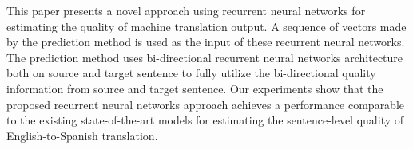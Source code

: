 This paper presents a novel approach using recurrent neural networks for estimating the quality of machine translation output. A sequence of vectors made by the prediction method is used as the input of these recurrent neural networks. The prediction method uses bi-directional recurrent neural networks architecture both on source and target sentence to fully utilize the bi-directional quality information from source and target sentence. Our experiments show that the proposed recurrent neural networks approach achieves a performance comparable to the existing state-of-the-art models for estimating the sentence-level quality of English-to-Spanish translation.
